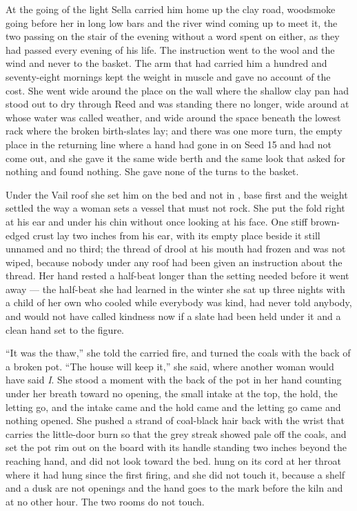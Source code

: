 At the going of the light Sella carried him home up the clay road, woodsmoke going before her in long low bars and the river wind coming up to meet it, the two passing on the stair of the evening without a word spent on either, as they had passed every evening of his life. The instruction went to the wool and the wind and never to the basket. The arm that had carried him a hundred and seventy-eight mornings kept the weight in muscle and gave no account of the cost. She went wide around the place on the wall where the shallow clay pan had stood out to dry through Reed and was standing there no longer, wide around  at  whose water was called weather, and wide around the space beneath the lowest rack where the broken birth-slates lay; and there was one more turn, the empty place in the returning line where a hand had gone in on Seed 15 and had not come out, and she gave it the same wide berth and the same look that asked for nothing and found nothing. She gave none of the turns to the basket.

Under the Vail roof she set him on the bed and not in , base first and the weight settled the way a woman sets a vessel that must not rock. She put the fold right at his ear and under his chin without once looking at his face. One stiff brown-edged crust lay two inches from his ear, with its empty place beside it still unnamed and no third; the thread of drool at his mouth had frozen and was not wiped, because nobody under any roof had been given an instruction about the thread. Her hand rested a half-beat longer than the setting needed before it went away --- the half-beat she had learned in the winter she sat up three nights with a child of her own who cooled while everybody was kind, had never told anybody, and would not have called kindness now if a slate had been held under it and a clean hand set to the figure.

“It was the thaw,” she told the carried fire, and turned the coals with the back of a broken pot. “The house will keep it,” she said, where another woman would have said \emph{I}. She stood a moment with the back of the pot in her hand counting under her breath toward no opening, the small intake at the top, the hold, the letting go, and the intake came and the hold came and the letting go came and nothing opened. She pushed a strand of coal-black hair back with the wrist that carries the little-door burn so that the grey streak showed pale off the coals, and set the pot rim out on the board with its handle standing two inches beyond the reaching hand, and did not look toward the bed.  hung on its cord at her throat where it had hung since the first firing, and she did not touch it, because a shelf and a dusk are not openings and the hand goes to the mark before the kiln and at no other hour. The two rooms do not touch.

